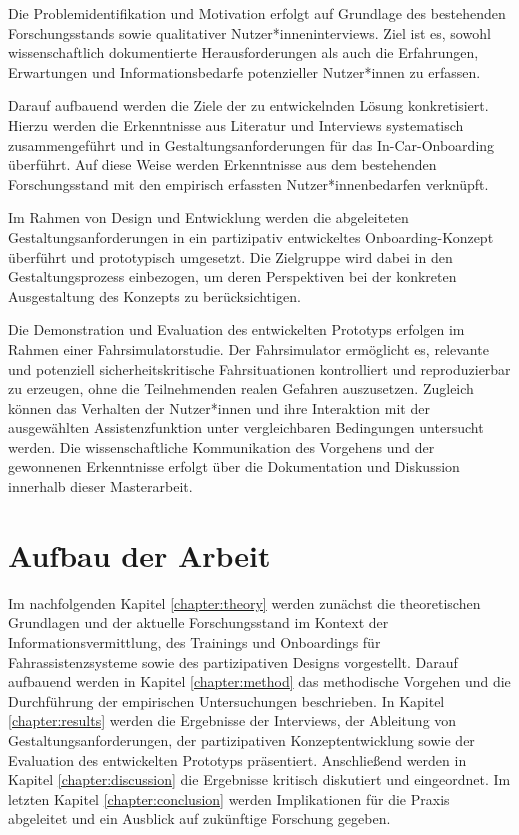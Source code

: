 Die Problemidentifikation und Motivation erfolgt auf Grundlage des bestehenden Forschungsstands sowie qualitativer Nutzer*inneninterviews. Ziel ist es, sowohl wissenschaftlich dokumentierte Herausforderungen als auch die Erfahrungen, Erwartungen und Informationsbedarfe potenzieller Nutzer*innen zu erfassen.

Darauf aufbauend werden die Ziele der zu entwickelnden Lösung konkretisiert. Hierzu werden die Erkenntnisse aus Literatur und Interviews systematisch zusammengeführt und in Gestaltungsanforderungen für das In-Car-Onboarding überführt. Auf diese Weise werden Erkenntnisse aus dem bestehenden Forschungsstand mit den empirisch erfassten Nutzer*innenbedarfen verknüpft.

Im Rahmen von Design und Entwicklung werden die abgeleiteten Gestaltungsanforderungen in ein partizipativ entwickeltes Onboarding-Konzept überführt und prototypisch umgesetzt. Die Zielgruppe wird dabei in den Gestaltungsprozess einbezogen, um deren Perspektiven bei der konkreten Ausgestaltung des Konzepts zu berücksichtigen.

Die Demonstration und Evaluation des entwickelten Prototyps erfolgen im Rahmen einer Fahrsimulatorstudie. Der Fahrsimulator ermöglicht es, relevante und potenziell sicherheitskritische Fahrsituationen kontrolliert und reproduzierbar zu erzeugen, ohne die Teilnehmenden realen Gefahren auszusetzen. Zugleich können das Verhalten der Nutzer*innen und ihre Interaktion mit der ausgewählten Assistenzfunktion unter vergleichbaren Bedingungen untersucht werden. Die wissenschaftliche Kommunikation des Vorgehens und der gewonnenen Erkenntnisse erfolgt über die Dokumentation und Diskussion innerhalb dieser Masterarbeit.


\section{Aufbau der Arbeit}
\label{sec:aufbau_der_arbeit}

Im nachfolgenden Kapitel \ref{chapter:theory} werden zunächst die theoretischen Grundlagen und der aktuelle Forschungsstand im Kontext der Informationsvermittlung, des Trainings und Onboardings für Fahrassistenzsysteme sowie des partizipativen Designs vorgestellt. Darauf aufbauend werden in Kapitel \ref{chapter:method} das methodische Vorgehen und die Durchführung der empirischen Untersuchungen beschrieben. In Kapitel \ref{chapter:results} werden die Ergebnisse der Interviews, der Ableitung von Gestaltungsanforderungen, der partizipativen Konzeptentwicklung sowie der Evaluation des entwickelten Prototyps präsentiert. Anschließend werden in Kapitel \ref{chapter:discussion} die Ergebnisse kritisch diskutiert und eingeordnet. Im letzten Kapitel \ref{chapter:conclusion} werden Implikationen für die Praxis abgeleitet und ein Ausblick auf zukünftige Forschung gegeben.
